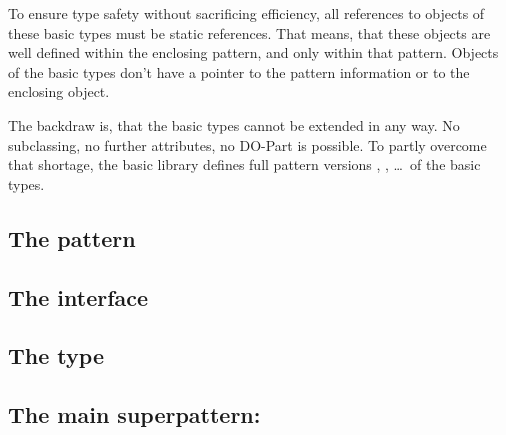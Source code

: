 To ensure type safety without sacrificing efficiency, all
references to objects of these basic types must be static
references.  That means, that these objects are well defined
within the enclosing pattern, and only within that pattern.
Objects of the basic types don't have a pointer to the pattern
information or to the enclosing object.

The backdraw is, that the basic types cannot be extended in any
way.  No subclassing, no further attributes, no DO-Part is
possible.  To partly overcome that shortage, the basic library
 defines full pattern versions
, , \ldots\ of the basic types.

\subsection{The  pattern}

\subsection{The  interface}

\subsection{The  type}

\subsection{The main superpattern: }

